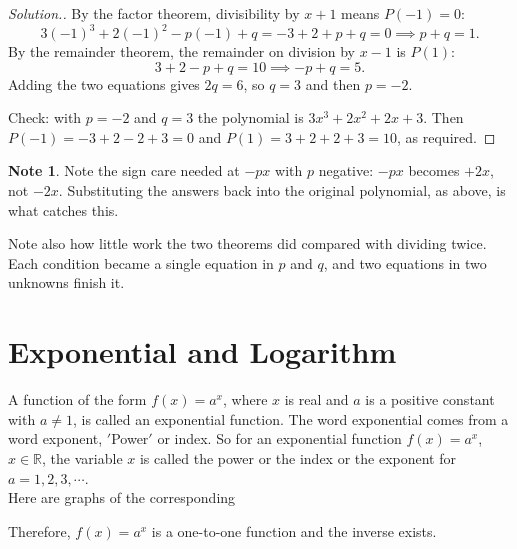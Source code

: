 \documentclass[11pt,a4paper]{article}
\theoremstyle{definition}
\newtheorem{note}[thm]{Note}
\newenvironment{solution}
  {\renewcommand{\qedsymbol}{}\begin{proof}[\textit{Solution}.]}
  {\end{proof}}
\begin{document}
\begin{solution}
By the factor theorem, divisibility by $x+1$ means $P(-1)=0$:
$$3(-1)^{3}+2(-1)^{2}-p(-1)+q=-3+2+p+q=0
\implies p+q=1 .$$
By the remainder theorem, the remainder on division by $x-1$ is $P(1)$:
$$3+2-p+q=10 \implies -p+q=5 .$$
Adding the two equations gives $2q=6$, so $q=3$ and then $p=-2$.

Check: with $p=-2$ and $q=3$ the polynomial is $3x^{3}+2x^{2}+2x+3$. Then
$P(-1)=-3+2-2+3=0$ and $P(1)=3+2+2+3=10$, as required.
\end{solution}

\begin{note}
Note the sign care needed at $-px$ with $p$ negative: $-px$ becomes $+2x$, not
$-2x$. Substituting the answers back into the original polynomial, as above, is
what catches this.

Note also how little work the two theorems did compared with dividing twice. Each
condition became a single equation in $p$ and $q$, and two equations in two
unknowns finish it.
\end{note}

\pagebreak
\section{Exponential and Logarithm}

A function of the form $f(x)=a^x$, where $x$ is real and $a$ is a positive constant with $a\neq 1$, is called an exponential function. The word exponential comes from a word exponent, $'$Power$'$ or index. So for an exponential function $f(x)=a^x$, $x\in \mathbb{R}$, the variable $x$ is called the power or the index or the exponent for $a=1,2,3,\cdots$.\\

Here are graphs of the corresponding\\


\begin{figure}[H]
\centering
{}
\end{figure} 

Therefore, $f(x)=a^x$ is a one-to-one function and the inverse exists.
\end{document}
